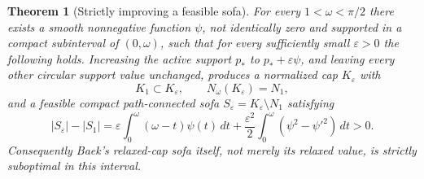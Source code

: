 \documentclass[11pt]{article}
\newtheorem{theorem}{Theorem}
\begin{document}
\begin{theorem}[Strictly improving a feasible sofa]\label{thm:improvement}
For every $1<\omega<\pi/2$ there exists a smooth nonnegative function $\psi$, not identically zero and supported in a compact subinterval of $(0,\omega)$, such that for every sufficiently small $\varepsilon>0$ the following holds. Increasing the active support $p_*$ to $p_*+\varepsilon\psi$, and leaving every other circular support value unchanged, produces a normalized cap $K_\varepsilon$ with
\[
 K_1\subset K_\varepsilon,\qquad
 N_\omega(K_\varepsilon)=N_1,
\]
and a feasible compact path-connected sofa $S_\varepsilon=K_\varepsilon\setminus N_1$ satisfying
\[
 |S_\varepsilon|-|S_1|
 =\varepsilon\int_0^\omega(\omega-t)\psi(t)\,dt
  +\frac{\varepsilon^2}{2}\int_0^\omega(\psi^2-\psi'^2)\,dt>0.
\]
Consequently Baek's relaxed-cap sofa itself, not merely its relaxed value, is strictly suboptimal in this interval.
\end{theorem}
\end{document}
